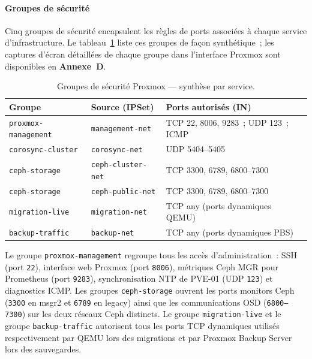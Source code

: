 \paragraph{Groupes de sécurité}

\par Cinq groupes de sécurité encapsulent les règles de ports associées à
chaque service d'infrastructure. Le
tableau~\ref{tab:fw-security-groups} liste ces groupes de façon synthétique~;
les captures d'écran détaillées de chaque groupe dans l'interface Proxmox
sont disponibles en \textbf{Annexe~D}.

\begin{table}[H]
\centering
\caption{Groupes de sécurité Proxmox — synthèse par service.}
\label{tab:fw-security-groups}
\begin{tabular}{|l|l|l|}
\hline
\textbf{Groupe} & \textbf{Source (IPSet)} & \textbf{Ports autorisés (IN)} \\
\hline
\texttt{proxmox-management} & \texttt{management-net} & TCP 22, 8006, 9283~; UDP 123~; ICMP \\
\hline
\texttt{corosync-cluster}   & \texttt{corosync-net}     & UDP 5404--5405 \\
\hline
\texttt{ceph-storage}       & \texttt{ceph-cluster-net} & TCP 3300, 6789, 6800--7300 \\
\hline
\texttt{ceph-storage}       & \texttt{ceph-public-net}  & TCP 3300, 6789, 6800--7300 \\
\hline
\texttt{migration-live}     & \texttt{migration-net}    & TCP any (ports dynamiques QEMU) \\
\hline
\texttt{backup-traffic}     & \texttt{backup-net}       & TCP any (ports dynamiques PBS) \\
\hline
\end{tabular}
\end{table}

\par Le groupe \texttt{proxmox-management} regroupe tous les accès
d'administration~: SSH (port \texttt{22}), interface web Proxmox (port
\texttt{8006}), métriques Ceph MGR pour Prometheus (port \texttt{9283}),
synchronisation NTP de PVE-01 (UDP \texttt{123}) et diagnostics ICMP. Les
groupes \texttt{ceph-storage} ouvrent les ports monitors Ceph (\texttt{3300}
en msgr2 et \texttt{6789} en legacy) ainsi que les communications OSD
(\texttt{6800--7300}) sur les deux réseaux Ceph distincts. Le groupe
\texttt{migration-live} et le groupe \texttt{backup-traffic} autorisent
tous les ports TCP dynamiques utilisés respectivement par QEMU lors des
migrations et par Proxmox Backup Server lors des sauvegardes.\\

